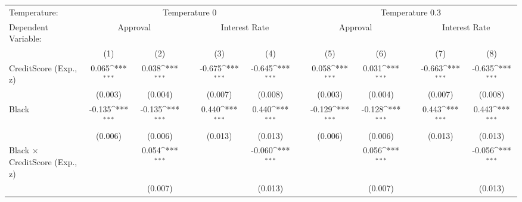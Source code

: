 {
\def\sym#1{\ifmmode^{#1}\else\(^{#1}\)\fi}
\begin{tabular}{l*{11}{c}}
\toprule
Temperature: & \multicolumn{5}{c}{Temperature 0} & & \multicolumn{5}{c}{Temperature 0.3} \\
\cmidrule(lr){2-6} \cmidrule(lr){8-11}
Dependent Variable:                     &\multicolumn{2}{c}{Approval}         &         &\multicolumn{2}{c}{Interest Rate}    &         &\multicolumn{2}{c}{Approval}         &         &\multicolumn{2}{c}{Interest Rate}    \\\cmidrule(lr){2-3}\cmidrule(lr){5-6}\cmidrule(lr){8-9}\cmidrule(lr){11-12}
                                        &\multicolumn{1}{c}{(1)}         &\multicolumn{1}{c}{(2)}         &         &\multicolumn{1}{c}{(3)}         &\multicolumn{1}{c}{(4)}         &         &\multicolumn{1}{c}{(5)}         &\multicolumn{1}{c}{(6)}         &         &\multicolumn{1}{c}{(7)}         &\multicolumn{1}{c}{(8)}         \\
\midrule
CreditScore (Exp., z)                   &    0.065\sym{***}&    0.038\sym{***}&         &   -0.675\sym{***}&   -0.645\sym{***}&         &    0.058\sym{***}&    0.031\sym{***}&         &   -0.663\sym{***}&   -0.635\sym{***}\\
                                        &  (0.003)         &  (0.004)         &         &  (0.007)         &  (0.008)         &         &  (0.003)         &  (0.004)         &         &  (0.007)         &  (0.008)         \\
Black                                   &   -0.135\sym{***}&   -0.135\sym{***}&         &    0.440\sym{***}&    0.440\sym{***}&         &   -0.129\sym{***}&   -0.128\sym{***}&         &    0.443\sym{***}&    0.443\sym{***}\\
                                        &  (0.006)         &  (0.006)         &         &  (0.013)         &  (0.013)         &         &  (0.006)         &  (0.006)         &         &  (0.013)         &  (0.013)         \\
Black $\times$ CreditScore (Exp., z)    &                  &    0.054\sym{***}&         &                  &   -0.060\sym{***}&         &                  &    0.056\sym{***}&         &                  &   -0.056\sym{***}\\
                                        &                  &  (0.007)         &         &                  &  (0.013)         &         &                  &  (0.007)         &         &                  &  (0.013)         \\

\end{tabular}}

